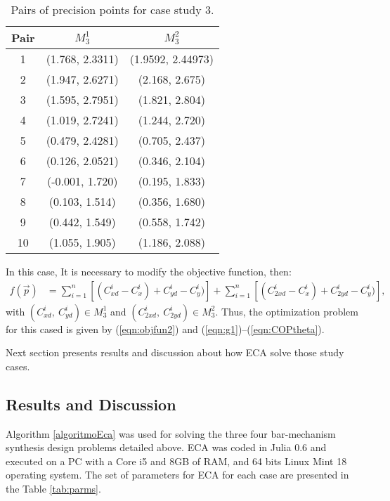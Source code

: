 \documentclass[12pt,letterpape]{article}
\begin{document}
\begin{itemize}
\begin{table}[!ht]
	\centering
	\begin{tabular}{ccc}
			\hline
			Pair  &    $M_{3}^1$    &    $M_{3}^2$      \\
			\hline
			1 & (1.768, 2.3311) & (1.9592, 2.44973) \\
			2 & (1.947, 2.6271) & (2.168, 2.675)    \\
			3 & (1.595, 2.7951) & (1.821, 2.804)    \\
			4 & (1.019, 2.7241) & (1.244, 2.720)    \\
			5 & (0.479, 2.4281) & (0.705, 2.437)    \\
			6 & (0.126, 2.0521) & (0.346, 2.104)    \\
			7 & (-0.001, 1.720) & (0.195, 1.833)    \\
			8 & (0.103, 1.514)  & (0.356, 1.680)    \\
			9 & (0.442, 1.549)  & (0.558, 1.742)    \\
		   10 & (1.055, 1.905)  & (1.186, 2.088)    \\
			\hline
	\end{tabular}
	\caption{Pairs of precision points for case study 3.}
\end{table}
In this case, It is necessary to modify the objective function, then:
\begin{align}
	f(\vec{p}) &= \sum_{i=1}^n \left[ (C_{xd}^i - C_x^i) + C_{yd}^i - C_y^i) \right]
	+ \sum_{i=1}^n \left[ (C_{2xd}^i - C_x^i) + C_{2yd}^i - C_y^i) \right],
	\label{eqn:objfun2}
\end{align}
with $(C_{xd}^i,\ C_{yd}^i) \in M_3^1 $ and $(C_{2xd}^i,\ C_{2yd}^i) \in M_3^2 $.
Thus, the optimization problem for this cased is given by (\ref{eqn:objfun2}) and
 (\ref{eqn:g1})--(\ref{eqn:COPtheta}).

\end{itemize}

Next section presents results and discussion about how ECA solve those study cases.


\subsection{Results and Discussion} %
\label{sec:results1}
%
%
Algorithm \ref{algoritmoEca} was used for solving the three four bar-mechanism
synthesis design problems detailed above. ECA was coded in Julia 0.6 and executed
on a PC with a Core i5 and 8GB of RAM, and 64 bits Linux Mint 18 operating system.
The set of parameters for ECA for each case are presented in the Table \ref{tab:parms}.
% 
\end{document}
